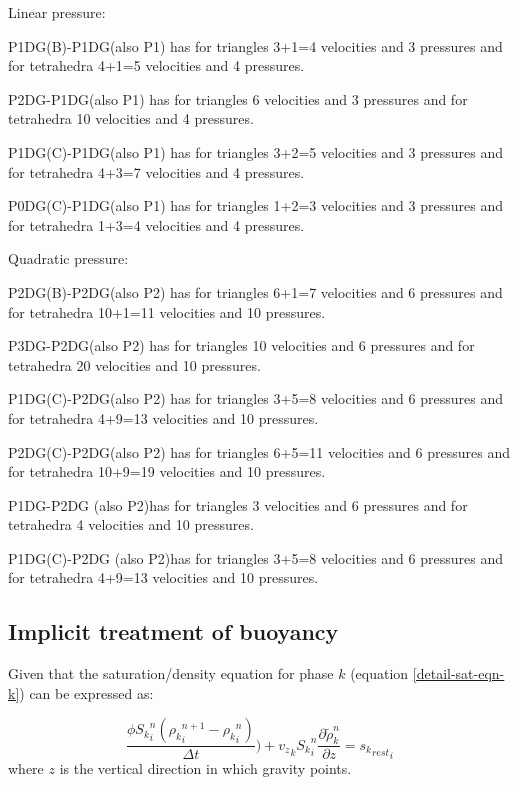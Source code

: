 \noindent
\noindent
Linear pressure: 

\noindent
P1DG(B)-P1DG(also P1) has for triangles 3+1=4 velocities and 3 pressures and 
for tetrahedra 4+1=5 velocities and 4 pressures. 

\noindent
P2DG-P1DG(also P1) has for triangles 6 velocities and 3 pressures and 
for tetrahedra 10 velocities and 4 pressures. 

\noindent
P1DG(C)-P1DG(also P1) has for triangles 3+2=5 velocities and 3 pressures and 
for tetrahedra 4+3=7 velocities and 4 pressures. 

\noindent
P0DG(C)-P1DG(also P1) has for triangles 1+2=3 velocities and 3 pressures and 
for tetrahedra 1+3=4 velocities and 4 pressures. 


\noindent
\noindent
Quadratic pressure: 

\noindent
P2DG(B)-P2DG(also P2) has for triangles 6+1=7 velocities and 6 pressures and 
for tetrahedra 10+1=11 velocities and 10 pressures. 

\noindent
P3DG-P2DG(also P2) has for triangles 10 velocities and 6 pressures and 
for tetrahedra 20 velocities and 10 pressures. 

\noindent
P1DG(C)-P2DG(also P2) has for triangles 3+5=8 velocities and 6 pressures and 
for tetrahedra 4+9=13 velocities and 10 pressures. 

\noindent
P2DG(C)-P2DG(also P2) has for triangles 6+5=11 velocities and 6 pressures and 
for tetrahedra 10+9=19 velocities and 10 pressures. 

\noindent
P1DG-P2DG (also P2)has for triangles 3 velocities and 6 pressures and 
for tetrahedra 4 velocities and 10 pressures. 

\noindent
P1DG(C)-P2DG (also P2)has for triangles 3+5=8 velocities and 6 pressures and 
for tetrahedra 4+9=13 velocities and 10 pressures. 




\subsection{Implicit treatment of buoyancy} 
Given that the saturation/density equation for phase 
$k$ (equation \ref{detail-sat-eqn-k}) can be expressed as:

\begin{equation}
 \frac{\phi{S_k}_i^n( {\rho_k}_i^{n+1}-{\rho_k}_i^n)} {\Delta t} ) 
 + {v_z}_k {S_k}_i^n \frac{\partial \tilde \rho_k^n }{ \partial z}  
= {{s_k}_{rest}}_i
\label{sat-part} 
\end{equation}
where $z$ is the vertical direction in which gravity points. 

